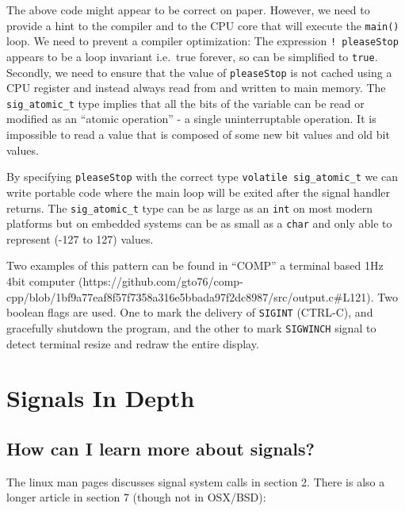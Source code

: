 The above code might appear to be correct on paper. However, we need to
provide a hint to the compiler and to the CPU core that will execute the
\texttt{main()} loop. We need to prevent a compiler optimization: The
expression \texttt{!\ pleaseStop} appears to be a loop invariant
i.e.~true forever, so can be simplified to \texttt{true}. Secondly, we
need to ensure that the value of \texttt{pleaseStop} is not cached using
a CPU register and instead always read from and written to main memory.
The \texttt{sig\_atomic\_t} type implies that all the bits of the
variable can be read or modified as an ``atomic operation'' - a single
uninterruptable operation. It is impossible to read a value that is
composed of some new bit values and old bit values.

By specifying \texttt{pleaseStop} with the correct type
\texttt{volatile\ sig\_atomic\_t} we can write portable code where the
main loop will be exited after the signal handler returns. The
\texttt{sig\_atomic\_t} type can be as large as an \texttt{int} on most
modern platforms but on embedded systems can be as small as a
\texttt{char} and only able to represent (-127 to 127) values.

\begin{Shaded}
\begin{Highlighting}[]
 
\end{Highlighting}
\end{Shaded}

Two examples of this pattern can be found in ``COMP'' a terminal based
1Hz 4bit computer
(https://github.com/gto76/comp-cpp/blob/1bf9a77eaf8f57f7358a316e5bbada97f2dc8987/src/output.c\#L121).
Two boolean flags are used. One to mark the delivery of \texttt{SIGINT}
(CTRL-C), and gracefully shutdown the program, and the other to mark
\texttt{SIGWINCH} signal to detect terminal resize and redraw the entire
display.

\section{Signals In Depth}\label{signals-in-depth}

\subsection{How can I learn more about
signals?}\label{how-can-i-learn-more-about-signals}

The linux man pages discusses signal system calls in section 2. There is
also a longer article in section 7 (though not in OSX/BSD):

